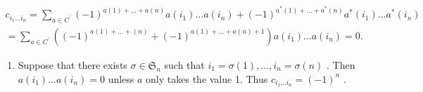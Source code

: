 \[
\begin{array}{l} c _ {i _ {1} \dots i _ {n}} = \sum_ {a \in C ^ {\prime}} (- 1) ^ {a (1) + \dots + a (n)} a (i _ {1}) \dots a (i _ {n}) + (- 1) ^ {a ^ {*} (1) + \dots + a ^ {*} (n)} a ^ {*} (i _ {1}) \dots a ^ {*} (i _ {n}) \\ = \sum_ {a \in C ^ {\prime}} ((- 1) ^ {a (1) + \dots + (n)} + (- 1) ^ {a (1) + \dots + a (n) + 1}) a (i _ {1}) \dots a (i _ {n}) = 0. \end{array}
\]

\begin{enumerate}
\def\labelenumi{(\arabic{enumi})}
\setcounter{enumi}{1}
\tightlist
\item
  Suppose that there exists \(\sigma \in \mathfrak{S}_n\) such that \(i_1 = \sigma(1), \ldots, i_n = \sigma(n)\) . Then \(a(i_1) \ldots a(i_n) = 0\) unless \(a\) only takes the value 1. Thus \(c_{i_1 \ldots i_n} = (-1)^n\) .
\end{enumerate}


